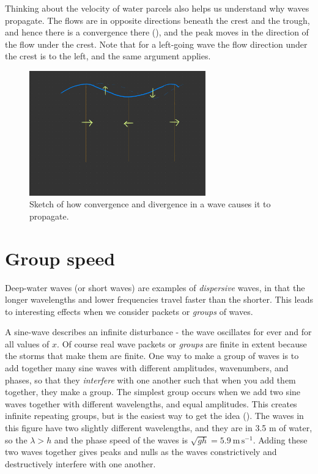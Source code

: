 Thinking about the velocity of water parcels also helps us understand why waves propagate.  The flows are in opposite directions beneath the crest and the trough, and hence there is a convergence there (), and the peak moves in the direction of the flow under the crest.  Note that for a left-going wave the flow direction under the crest is to the left, and the same argument applies.  

\begin{figure}[hbt]
  \begin{center}
    \includegraphics[width=3in]{figs/Waves/SketchesWaveConvergence}
    \caption{Sketch of how convergence and divergence in a wave causes it to propagate.}
    \label{fig:SketchesWaveConvergence}  
  \end{center}
\end{figure}

\section{Group speed}


Deep-water waves (or short waves) are examples of \emph{dispersive} waves, in that the longer wavelengths and lower frequencies travel faster than the shorter.  This leads to interesting effects when we consider packets or \emph{groups} of waves.  

A sine-wave describes an infinite disturbance - the wave oscillates for ever and for all values of $x$.  Of course real wave packets or \emph{groups} are finite in extent because the storms that make them are finite.  One way to make a group of waves is to add together many sine waves with different amplitudes, wavenumbers, and phases, so that they \emph{interfere} with one another such that when you add them together, they make a group.  The simplest group occurs when we add two sine waves together with different wavelengths, and equal amplitudes.  This creates infinite repeating groups, but is the easiest way to get the idea ().  The waves in this figure have two slightly different wavelengths, and they are in 3.5 m of water, so the $\lambda > h$ and the phase speed of the waves is $\sqrt{gh} = 5.9\ \mathrm{m\,s^{-1}}$.  Adding these two waves together gives peaks and nulls as the waves constrictively and destructively interfere with one another.

